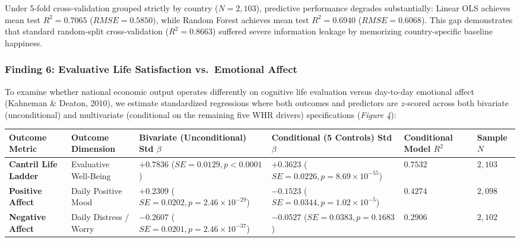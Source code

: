 \documentclass[
]{article}
\begin{document}
Under 5-fold cross-validation grouped strictly by country
(\(N = 2,103\)), predictive performance degrades substantially: Linear
OLS achieves mean test \(R^2 = 0.7065\) (\(RMSE = 0.5850\)), while
Random Forest achieves mean test \(R^2 = 0.6940\) (\(RMSE = 0.6068\)).
This gap demonstrates that standard random-split cross-validation
(\(R^2 = 0.8663\)) suffered severe information leakage by memorizing
country-specific baseline happiness.

\hypertarget{finding-6-evaluative-life-satisfaction-vs.-emotional-affect}{%
\subsubsection{Finding 6: Evaluative Life Satisfaction vs.~Emotional
Affect}\label{finding-6-evaluative-life-satisfaction-vs.-emotional-affect}}

To examine whether national economic output operates differently on
cognitive life evaluation versus day-to-day emotional affect (Kahneman
\& Deaton, 2010), we estimate standardized regressions where both
outcomes and predictors are \(z\)-scored across both bivariate
(unconditional) and multivariate (conditional on the remaining five WHR
drivers) specifications (\emph{Figure 4}):

\begin{longtable}[]{@{}
  >{\raggedright\arraybackslash}p{}
  >{\raggedright\arraybackslash}p{}
  >{\raggedright\arraybackslash}p{}
  >{\raggedright\arraybackslash}p{}
  >{\raggedright\arraybackslash}p{}
  >{\raggedright\arraybackslash}p{}@{}}
\toprule
Outcome Metric & Outcome Dimension & Bivariate (Unconditional) Std
\(\beta\) & Conditional (5 Controls) Std \(\beta\) & Conditional Model
\(R^2\) & Sample \(N\) \\
\midrule
\endhead
\textbf{Cantril Life Ladder} & Evaluative Well-Being &
\textbf{\(+0.7836\)} (\(SE = 0.0129, p < 0.0001\)) &
\textbf{\(+0.3623\)} (\(SE = 0.0226, p = 8.69 \times 10^{-55}\)) &
\(0.7532\) & \(2,103\) \\
\textbf{Positive Affect} & Daily Positive Mood & \textbf{\(+0.2309\)}
(\(SE = 0.0202, p = 2.46 \times 10^{-29}\)) & \textbf{\(-0.1523\)}
(\(SE = 0.0344, p = 1.02 \times 10^{-5}\)) & \(0.4274\) & \(2,098\) \\
\textbf{Negative Affect} & Daily Distress / Worry & \textbf{\(-0.2607\)}
(\(SE = 0.0201, p = 2.46 \times 10^{-37}\)) & \textbf{\(-0.0527\)}
(\(SE = 0.0383, p = 0.1683\)) & \(0.2906\) & \(2,102\) \\
\bottomrule
\end{longtable}
\end{document}
